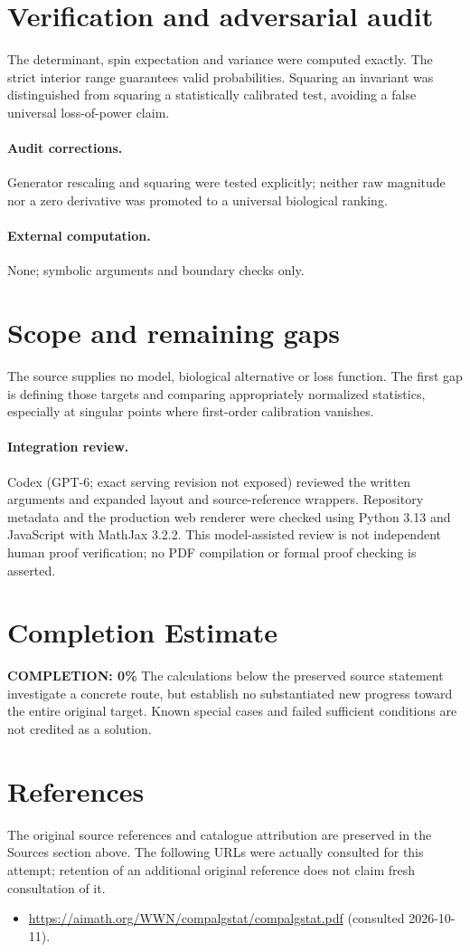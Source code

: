 \documentclass[11pt]{article}
\begin{document}
\section{Verification and adversarial audit}
The determinant, spin expectation and variance were computed exactly.
The strict interior range guarantees valid probabilities. Squaring an invariant
was distinguished from squaring a statistically calibrated test, avoiding a
false universal loss-of-power claim.
\paragraph{Audit corrections.} Generator rescaling and squaring were tested explicitly; neither raw magnitude nor a zero derivative was promoted to a universal biological ranking.
\paragraph{External computation.} None; symbolic arguments and boundary checks only.
\section{Scope and remaining gaps}
The source supplies no model, biological alternative or loss function.
The first gap is defining those targets and comparing appropriately normalized
statistics, especially at singular points where first-order calibration vanishes.
\paragraph{Integration review.} Codex (GPT-6; exact serving revision not exposed) reviewed the written arguments and expanded layout and source-reference wrappers. Repository metadata and the production web renderer were checked using Python 3.13 and JavaScript with MathJax 3.2.2. This model-assisted review is not independent human proof verification; no PDF compilation or formal proof checking is asserted.

\section{Completion Estimate}
\noindent\textbf{COMPLETION: 0\%}
The calculations below the preserved source statement investigate a concrete route,
but establish no substantiated new progress toward the entire original target.
Known special cases and failed sufficient conditions are not credited as a solution.
\section{References}
The original source references and catalogue attribution are preserved in the
Sources section above. The following URLs were actually consulted for this attempt;
retention of an additional original reference does not claim fresh consultation of it.
\begin{itemize}
\item \url{https://aimath.org/WWN/compalgstat/compalgstat.pdf} (consulted 2026-10-11). 
\end{itemize}
\end{document}
